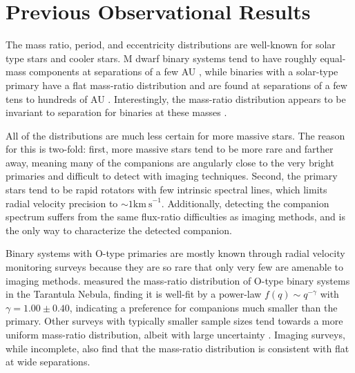 \documentclass{utthesis}
\begin{document}
\section{Previous Observational Results}

The mass ratio, period, and eccentricity distributions are well-known for solar type stars and cooler stars. M dwarf binary systems tend to have roughly equal-mass components at separations of a few AU \citep{Fischer1992}, while binaries with a solar-type primary have a flat mass-ratio distribution and are found at separations of a few tens to hundreds of AU \citep{Raghavan2010}. Interestingly, the mass-ratio distribution appears to be invariant to separation for binaries at these masses \citep{Reggiani2011, Meyer2013}.

All of the distributions are much less certain for more massive stars. The reason for this is two-fold: first, more massive stars tend to be more rare and farther away, meaning many of the companions are angularly close to the very bright primaries and difficult to detect with imaging techniques. Second, the primary stars tend to be rapid rotators with few intrinsic spectral lines, which limits radial velocity precision to $\sim 1 \mathrm{km\ s}^{-1}$. Additionally, detecting the companion spectrum suffers from the same flux-ratio difficulties as imaging methods, and is the only way to characterize the detected companion.

Binary systems with O-type primaries are mostly known through radial velocity monitoring surveys because they are so rare that only very few are amenable to imaging methods. \citet{Sana2013} measured the mass-ratio distribution of O-type binary systems in the Tarantula Nebula, finding it is well-fit by a power-law $f(q) \sim q^{-\gamma}$ with $\gamma = 1.00 \pm 0.40$, indicating a preference for companions much smaller than the primary. Other surveys with typically smaller sample sizes tend towards a more uniform mass-ratio distribution, albeit with large uncertainty \citep{Sana2012, Kiminki2012}. Imaging surveys, while incomplete, also find that the mass-ratio distribution is consistent with flat \citep{Peter2012} at wide separations.
\end{document}
